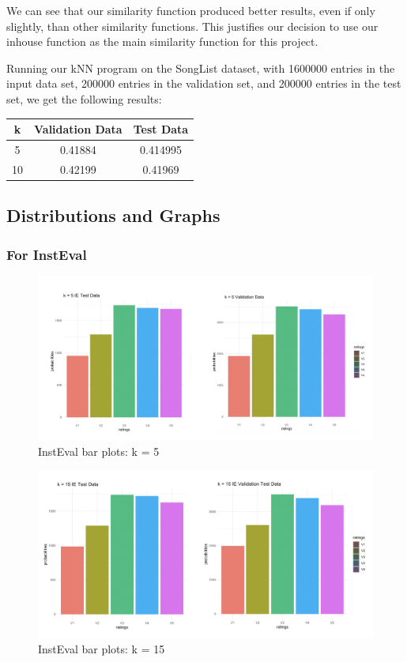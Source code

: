 \documentclass{article}
\begin{document}
We can see that our similarity function produced better results, even if only slightly, than other similarity functions. This justifies our decision to use our inhouse function as the main similarity function for this project. 

Running our kNN program on the SongList dataset, with 1600000 entries in the input data set, 200000 entries in the validation set, and 200000 entries in the test set, we get the following results:

\begin{center}
    \begin{tabular}{c|c|c}
        k & Validation Data & Test Data \\
        \hline
        5 & 0.41884 & 0.414995 \\
        10 & 0.42199 & 0.41969 \\
    \end{tabular}
\end{center}

\subsection{Distributions and Graphs}

\subsubsection{For InstEval}

\begin{figure}[ht]
\centering
\includegraphics[scale=0.35]{k = 5 IE Bar Plot.png}
\caption{InstEval bar plots: k = 5}
\end{figure}

\begin{figure}[ht]
\centering
\includegraphics[scale=0.35]{k = 15 IE Bar Plot.png}
\caption{InstEval bar plots: k = 15}
\end{figure}
\end{document}
